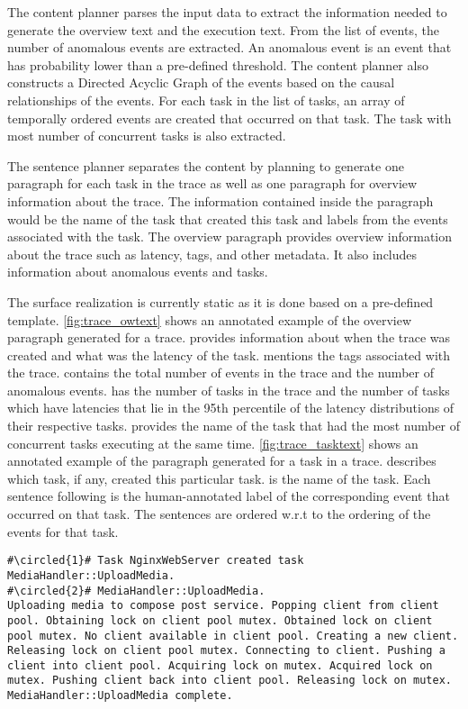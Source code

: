  The content planner parses the input data to extract the information
needed to generate the overview text and the execution text. From the list of events, the number
of anomalous events are extracted. An anomalous event is an event that has probability lower
than a pre-defined threshold. The content planner also constructs a Directed Acyclic Graph
of the events based on the causal relationships of the events. For each task in the list of tasks,
an array of temporally ordered events are created that occurred on that task. The task with most number of
concurrent tasks is also extracted.

 The sentence planner separates the content by planning to generate one paragraph
for each task in the trace as well as one paragraph for overview information about the trace.
The information contained inside the paragraph would be the name of the task that created this task
and labels from the events associated with the task.
The overview paragraph provides overview information about the trace such as latency, tags, and other metadata.
It also includes information about anomalous events and tasks.

 The surface realization is currently static as it is done based on
a pre-defined template. \autoref{fig:trace_owtext} shows an annotated example of the overview paragraph generated for a trace.
 provides information about when the trace was created and what was the latency of the task.
 mentions the tags associated with the trace.
 contains the total number of events in the trace and the number of anomalous events. 
 has the number of tasks in the trace and the number of tasks which have latencies that lie in the 95th percentile of the latency distributions
of their respective tasks. 
 provides the name of the task that had the most number of concurrent tasks executing at the same time.
\autoref{fig:trace_tasktext} shows an annotated example of the paragraph generated for a task in a trace.
 describes which task, if any, created this particular task.
 is the name of the task.
Each sentence following  is the human-annotated label of the corresponding event that occurred on that task.
The sentences are ordered w.r.t to the ordering of the events for that task.

\begin{lstlisting}[caption={Annotated paragraph generated for a task in a trace},captionpos=b,label={fig:trace_owtext}, escapechar=\#]
#\circled{1}# Task NginxWebServer created task MediaHandler::UploadMedia. 
#\circled{2}# MediaHandler::UploadMedia. 
Uploading media to compose post service. Popping client from client pool. Obtaining lock on client pool mutex. Obtained lock on client pool mutex. No client available in client pool. Creating a new client. Releasing lock on client pool mutex. Connecting to client. Pushing a client into client pool. Acquiring lock on mutex. Acquired lock on mutex. Pushing client back into client pool. Releasing lock on mutex. MediaHandler::UploadMedia complete. 
\end{lstlisting}

